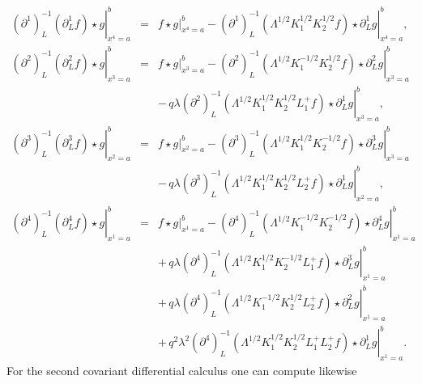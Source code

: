\documentclass[a4paper,11pt,oneside]{article}
\begin{document}
\begin{eqnarray}
\left. \left( \partial ^{1}\right) _{L}^{-1}\left( \partial _{L}^{1}f\right)
\star g\right| _{x^{4}=a}^{b} &=&\left. f\star g\right|
_{x^{4}=a}^{b}-\left. \left( \partial^{1}\right) _{L}^{-1}\left(
\Lambda ^{1/2}K_{1}^{1/2}K_{2}^{1/2}f\right) \star \partial _{L}^{1}g\right|
_{x^{4}=a}^{b}, \\
\left. \left( \partial ^{2}\right) _{L}^{-1}\left( \partial _{L}^{2}f\right)
\star g\right| _{x^{3}=a}^{b} &=&\left. f\star g\right|
_{x^{3}=a}^{b}-\left. \left( \partial^{2}\right) _{L}^{-1}\left(
\Lambda ^{1/2}K_{1}^{-1/2}K_{2}^{1/2}f\right) \star \partial
_{L}^{2}g\right| _{x^{3}=a}^{b}  \nonumber \\
&&-\,q\lambda \left. \left( \partial ^{2}\right) _{L}^{-1}\left( \Lambda
^{1/2}K_{1}^{1/2}K_{2}^{1/2}L_{1}^{+}f\right) \star \partial
_{L}^{1}g\right| _{x^{3}=a}^{b},  \nonumber \\
\left. \left( \partial ^{3}\right) _{L}^{-1}\left( \partial _{L}^{3}f\right)
\star g\right| _{x^{2}=a}^{b} &=&\left. f\star g\right|
_{x^{2}=a}^{b}-\left. \left( \partial^{3}\right) _{L}^{-1}\left(
\Lambda ^{1/2}K_{1}^{1/2}K_{2}^{-1/2}f\right) \star \partial
_{L}^{3}g\right| _{x^{3}=a}^{b}  \nonumber \\
&&-\,q\lambda \left. \left( \partial ^{3}\right) _{L}^{-1}\left( \Lambda
^{1/2}K_{1}^{1/2}K_{2}^{1/2}L_{2}^{+}f\right) \star \partial
_{L}^{1}g\right| _{x^{2}=a}^{b},  \nonumber \\
\left. \left( \partial ^{4}\right) _{L}^{-1}\left( \partial _{L}^{4}f\right)
\star g\right| _{x^{1}=a}^{b} &=&\left. f\star g\right|
_{x^{1}=a}^{b}-\left. \left( \partial^{4}\right) _{L}^{-1}\left(
\Lambda ^{1/2}K_{1}^{-1/2}K_{2}^{-1/2}f\right) \star \partial
_{L}^{4}g\right| _{x^{1}=a}^{b}  \nonumber \\
&&+\,q\lambda \left. \left( \partial ^{4}\right) _{L}^{-1}\left( \Lambda
^{1/2}K_{1}^{1/2}K_{2}^{-1/2}L_{1}^{+}f\right) \star \partial
_{L}^{3}g\right| _{x^{1}=a}^{b}  \nonumber \\
&&+\,q\lambda \left. \left( \partial ^{4}\right) _{L}^{-1}\left( \Lambda
^{1/2}K_{1}^{-1/2}K_{2}^{1/2}L_{2}^{+}f\right) \star \partial
_{L}^{2}g\right| _{x^{1}=a}^{b}  \nonumber \\
&&+\,q^{2}\lambda ^{2}\left. \left( \partial ^{4}\right) _{L}^{-1}\left(
\Lambda ^{1/2}K_{1}^{1/2}K_{2}^{1/2}L_{1}^{+}L_{2}^{+}f\right) \star
\partial _{L}^{1}g\right| _{x^{1}=a}^{b}.  \nonumber
\end{eqnarray}
For the second covariant differential calculus one can compute likewise 
\end{document}
